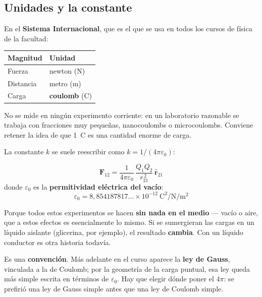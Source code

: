 \documentclass[12pt,a4paper]{article}
\begin{document}
\subsection{Unidades y la constante}

En el \textbf{Sistema Internacional}, que es el que se usa en todos los cursos de
física de la facultad:

\begin{table}[H]
\centering
\begin{tabular}{ll}
\toprule
\textbf{Magnitud} & \textbf{Unidad} \\
\midrule
Fuerza    & newton (\si{\newton}) \\
Distancia & metro (\si{\metre}) \\
Carga     & \textbf{coulomb} (\si{\coulomb}) \\
\bottomrule
\end{tabular}
\end{table}

\begin{notebox}
No se mide en ningún experimento corriente: en un laboratorio razonable se
trabaja con fracciones muy pequeñas, nanocoulombs o microcoulombs. Conviene
retener la idea de que \SI{1}{\coulomb} es una cantidad enorme de carga.
\end{notebox}

La constante $k$ se suele reescribir como $k = 1/(4\pi\varepsilon_0)$:

\begin{keybox}
\[
\boxed{\ \mathbf{F}_{12} = \frac{1}{4\pi\varepsilon_0}\,
        \frac{Q_1 Q_2}{r_{21}^{\,2}}\,\hat{\mathbf{r}}_{21}\ }
\]
donde $\varepsilon_0$ es la \textbf{permitividad eléctrica del vacío}:
\[
\varepsilon_0 = 8{,}854187817\ldots \times 10^{-12}\
  \si{\coulomb\squared\per\newton\per\metre\squared}
\]
\end{keybox}

\begin{notebox}
Porque todos estos experimentos se hacen \textbf{sin nada en el medio} --- vacío o
aire, que a estos efectos es esencialmente lo mismo. Si se sumergieran las cargas
en un líquido aislante (glicerina, por ejemplo), el resultado \textbf{cambia}. Con
un líquido conductor es otra historia todavía.
\end{notebox}

\begin{notebox}
Es una \textbf{convención}. Más adelante en el curso aparece la \textbf{ley de
Gauss}, vinculada a la de Coulomb; por la geometría de la carga puntual, esa ley
queda más simple escrita en términos de $\varepsilon_0$. Hay que elegir dónde
poner el $4\pi$: se prefirió una ley de Gauss simple antes que una ley de Coulomb
simple.
\end{notebox}
\end{document}

